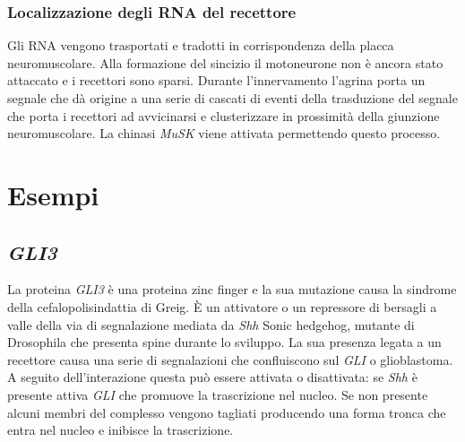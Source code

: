 		\subsubsection{Localizzazione degli RNA del recettore}
		Gli RNA vengono trasportati e tradotti in corrispondenza della placca neuromuscolare.
		Alla formazione del sincizio il motoneurone non \`e ancora stato attaccato e i recettori sono sparsi.
		Durante l'innervamento l'agrina porta un segnale che d\`a origine a una serie di cascati di eventi della trasduzione del segnale che porta i recettori ad avvicinarsi e clusterizzare in prossimit\`a della giunzione neuromuscolare.
		La chinasi \emph{MuSK}  viene attivata permettendo questo processo.

\section{Esempi}

	\subsection{\emph{GLI3}}
	La proteina \emph{GLI3} \`e una proteina zinc finger e la sua mutazione causa la sindrome della cefalopolisindattia di Greig.
	\`E un attivatore o un repressore di bersagli a valle della via di segnalazione mediata da \emph{Shh} Sonic hedgehog, mutante di Drosophila che presenta spine durante lo sviluppo.
	La sua presenza legata a un recettore causa una serie di segnalazioni che confluiscono sul \emph{GLI} o glioblastoma.
	A seguito dell'interazione questa pu\`o essere attivata o disattivata: se \emph{Shh} \`e presente attiva \emph{GLI} che promuove la trascrizione nel nucleo.
	Se non presente alcuni membri del complesso vengono tagliati producendo una forma tronca che entra nel nucleo e inibisce la trascrizione.

